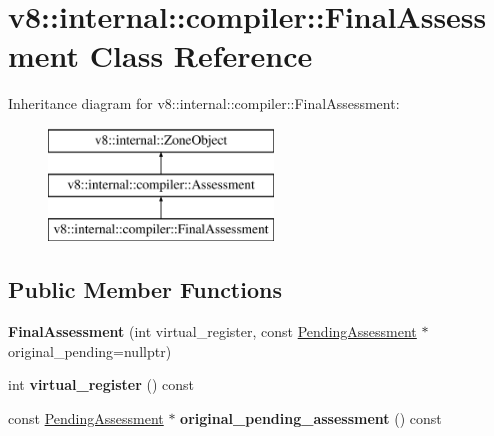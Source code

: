 \hypertarget{classv8_1_1internal_1_1compiler_1_1_final_assessment}{}\section{v8\+:\+:internal\+:\+:compiler\+:\+:Final\+Assessment Class Reference}
\label{classv8_1_1internal_1_1compiler_1_1_final_assessment}
Inheritance diagram for v8\+:\+:internal\+:\+:compiler\+:\+:Final\+Assessment\+:\begin{figure}[H]
\begin{center}
\leavevmode
\includegraphics[height=3.000000cm]{classv8_1_1internal_1_1compiler_1_1_final_assessment}
\end{center}
\end{figure}
\subsection*{Public Member Functions}
\begin{DoxyCompactItemize}
\item 
{\bfseries Final\+Assessment} (int virtual\+\_\+register, const \hyperlink{classv8_1_1internal_1_1compiler_1_1_pending_assessment}{Pending\+Assessment} $\ast$original\+\_\+pending=nullptr)\hypertarget{classv8_1_1internal_1_1compiler_1_1_final_assessment_a958ed354086f717f76cbdd3ee08970b0}{}\label{classv8_1_1internal_1_1compiler_1_1_final_assessment_a958ed354086f717f76cbdd3ee08970b0}

\item 
int {\bfseries virtual\+\_\+register} () const \hypertarget{classv8_1_1internal_1_1compiler_1_1_final_assessment_a88dbcb2eb6e4484dfdb96139720d6737}{}\label{classv8_1_1internal_1_1compiler_1_1_final_assessment_a88dbcb2eb6e4484dfdb96139720d6737}

\item 
const \hyperlink{classv8_1_1internal_1_1compiler_1_1_pending_assessment}{Pending\+Assessment} $\ast$ {\bfseries original\+\_\+pending\+\_\+assessment} () const \hypertarget{classv8_1_1internal_1_1compiler_1_1_final_assessment_a8f544e225f2e91b43968ec7870e5b5a4}{}\label{classv8_1_1internal_1_1compiler_1_1_final_assessment_a8f544e225f2e91b43968ec7870e5b5a4}

\end{DoxyCompactItemize}
